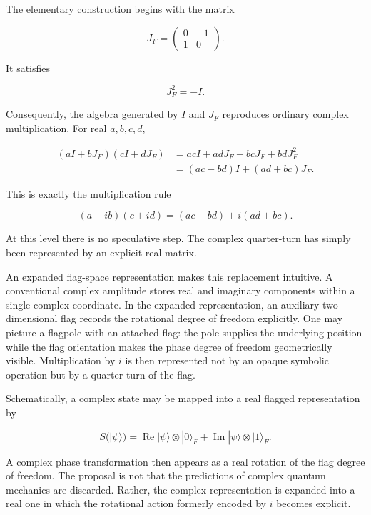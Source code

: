 \documentclass[11pt]{article}
\begin{document}
The elementary construction begins with the matrix

\begin{equation}
J_F
=
\begin{pmatrix}
0&-1\\
1&0
\end{pmatrix}.
\end{equation}

It satisfies

\begin{equation}
J_F^2=-I.
\end{equation}

Consequently, the algebra generated by $I$ and $J_F$ reproduces ordinary complex multiplication. For real $a,b,c,d$,

\begin{align}
(aI+bJ_F)(cI+dJ_F)
&=
acI+adJ_F+bcJ_F+bdJ_F^2\\
&=
(ac-bd)I+(ad+bc)J_F.
\end{align}

This is exactly the multiplication rule

\begin{equation}
(a+ib)(c+id)
=
(ac-bd)+i(ad+bc).
\end{equation}

At this level there is no speculative step. The complex quarter-turn has simply been represented by an explicit real matrix.

An expanded flag-space representation makes this replacement intuitive. A conventional complex amplitude stores real and imaginary components within a single complex coordinate. In the expanded representation, an auxiliary two-dimensional flag records the rotational degree of freedom explicitly. One may picture a flagpole with an attached flag: the pole supplies the underlying position while the flag orientation makes the phase degree of freedom geometrically visible. Multiplication by $i$ is then represented not by an opaque symbolic operation but by a quarter-turn of the flag.

Schematically, a complex state may be mapped into a real flagged representation by

\begin{equation}
S(|\psi\rangle)
=
\operatorname{Re}|\psi\rangle\otimes|0\rangle_F
+
\operatorname{Im}|\psi\rangle\otimes|1\rangle_F.
\end{equation}

A complex phase transformation then appears as a real rotation of the flag degree of freedom. The proposal is not that the predictions of complex quantum mechanics are discarded. Rather, the complex representation is expanded into a real one in which the rotational action formerly encoded by $i$ becomes explicit.
\end{document}
